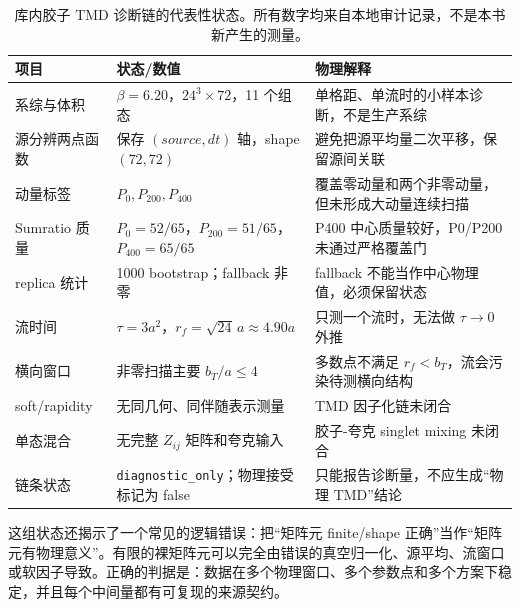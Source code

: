 \documentclass[UTF8,12pt,a4paper,twoside,openany]{ctexbook}
\begin{document}
\begin{table}[htbp]
\centering
\caption{库内胶子 TMD 诊断链的代表性状态。所有数字均来自本地审计记录，不是本书新产生的测量。}
\label{tab:audit-snapshot}
\small
\begin{tabularx}{\textwidth}{L{3.0cm}L{4.2cm}Y}
\toprule
项目 & 状态/数值 & 物理解释 \\
\midrule
系综与体积 & \(\beta=6.20\)，\(24^3\times72\)，11 个组态 & 单格距、单流时的小样本诊断，不是生产系综 \\
源分辨两点函数 & 保存 \((source,dt)\) 轴，shape \((72,72)\) & 避免把源平均量二次平移，保留源间关联 \\
动量标签 & \(P_0,P_{200},P_{400}\) & 覆盖零动量和两个非零动量，但未形成大动量连续扫描 \\
Sumratio 质量 & \(P_0=52/65\)，\(P_{200}=51/65\)，\(P_{400}=65/65\) & P400 中心质量较好，P0/P200 未通过严格覆盖门 \\
replica 统计 & 1000 bootstrap；fallback 非零 & fallback 不能当作中心物理值，必须保留状态 \\
流时间 & \(\tau=3a^2\)，\(r_f=\sqrt{24}\,a\approx4.90a\) & 只测一个流时，无法做 \(\tau\to0\) 外推 \\
横向窗口 & 非零扫描主要 \(b_T/a\le4\) & 多数点不满足 \(r_f<b_T\)，流会污染待测横向结构 \\
soft/rapidity & 无同几何、同伴随表示测量 & TMD 因子化链未闭合 \\
单态混合 & 无完整 \(Z_{ij}\) 矩阵和夸克输入 & 胶子-夸克 singlet mixing 未闭合 \\
链条状态 & \texttt{diagnostic\_only}；物理接受标记为 false & 只能报告诊断量，不应生成“物理 TMD”结论 \\
\bottomrule
\end{tabularx}
\end{table}

这组状态还揭示了一个常见的逻辑错误：把“矩阵元 finite/shape 正确”当作“矩阵元有物理意义”。有限的裸矩阵元可以完全由错误的真空归一化、源平均、流窗口或软因子导致。正确的判据是：数据在多个物理窗口、多个参数点和多个方案下稳定，并且每个中间量都有可复现的来源契约。
\end{document}
